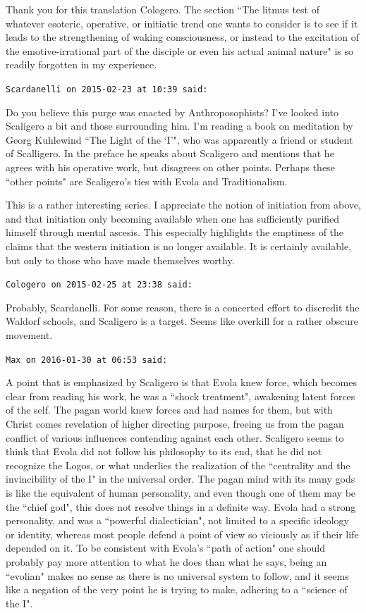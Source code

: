 \begin{footnotesize}
\begin{sffamily}
Thank you for this translation Cologero. The section ``The litmus test of whatever esoteric, operative, or initiatic trend one wants to consider is to see if it leads to the strengthening of waking consciousness, or instead to the excitation of the emotive-irrational part of the disciple or even his actual animal nature" is so readily forgotten in my experience.


\hfill

\texttt{Scardanelli on 2015-02-23 at 10:39 said: }

Do you believe this purge was enacted by Anthroposophists? I've looked into Scaligero a bit and those surrounding him. I'm reading a book on meditation by Georg Kuhlewind ``The Light of the `I'", who was apparently a friend or student of Scalligero. In the preface he speaks about Scaligero and mentions that he agrees with his operative work, but disagrees on other points. Perhaps these ``other points" are Scaligero's ties with Evola and Traditionalism.

This is a rather interesting series. I appreciate the notion of initiation from above, and that initiation only becoming available when one has sufficiently purified himself through mental ascesis. This especially highlights the emptiness of the claims that the western initiation is no longer available. It is certainly available, but only to those who have made themselves worthy.


\hfill

\texttt{Cologero on 2015-02-25 at 23:38 said: }

Probably, Scardanelli. For some reason, there is a concerted effort to discredit the Waldorf schools, and Scaligero is a target. Seems like overkill for a rather obscure movement.


\hfill

\texttt{Max on 2016-01-30 at 06:53 said: }

A point that is emphasized by Scaligero is that Evola knew force, which becomes clear from reading his work, he was a ``shock treatment", awakening latent forces of the self. The pagan world knew forces and had names for them, but with Christ comes revelation of higher directing purpose, freeing us from the pagan conflict of various influences contending against each other. Scaligero seems to think that Evola did not follow his philosophy to its end, that he did not recognize the Logos, or what underlies the realization of the ``centrality and the invincibility of the I" in the universal order. The pagan mind with its many gods is like the equivalent of human personality, and even though one of them may be the ``chief god", this does not resolve things in a definite way. Evola had a strong personality, and was a ``powerful dialectician", not limited to a specific ideology or identity, whereas most people defend a point of view so viciously as if their life depended on it. To be consistent with Evola's ``path of action" one should probably pay more attention to what he does than what he says, being an ``evolian" makes no sense as there is no universal system to follow, and it seems like a negation of the very point he is trying to make, adhering to a ``science of the I". 


\end{sffamily}
\end{footnotesize}
